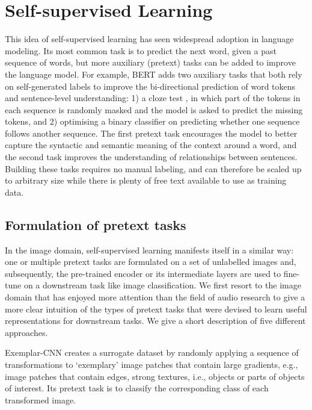 \section{Self-supervised Learning}\label{sec:self_supervised_learning}
This idea of self-supervised learning has seen widespread adoption in language modeling.
Its most common task is to predict the next word, given a past sequence of words, but more auxiliary (pretext) tasks can be added to improve the language model.
For example, BERT \cite{Devlin2019BERTPO} adds two auxiliary tasks that both rely on self-generated labels to improve the bi-directional prediction of word tokens and sentence-level understanding: 1) a cloze test \cite{doi:10.1177/107769905303000401}, in which part of the tokens in each sequence is randomly masked and the model is asked to predict the missing tokens, and 2) optimising a binary classifier on predicting whether one sequence follows another sequence.
The first pretext task encourages the model to better capture the syntactic and semantic meaning of the context around a word, and the second task improves the understanding of relationships between sentences.
Building these tasks requires no manual labeling, and can therefore be scaled up to arbitrary size while there is plenty of free text available to use as training data.\\

\subsection{Formulation of pretext tasks}
In the image domain, self-supervised learning manifests itself in a similar way: one or multiple pretext tasks are formulated on a set of unlabelled images and, subsequently, the pre-trained encoder or its intermediate layers are used to fine-tune on a downstream task like image classification.
We first resort to the image domain that has enjoyed more attention than the field of audio research to give a more clear intuition of the types of pretext tasks that were devised to learn useful representations for downstream tasks.
We give a short description of five different approaches.

Exemplar-CNN \cite{dosovitskiy_discriminative_2014} creates a surrogate dataset by randomly applying a sequence of transformations to `exemplary' image patches that contain large gradients, e.g., image patches that contain edges, strong textures, i.e., objects or parts of objects of interest.
Its pretext task is to classify the corresponding class of each transformed image.

